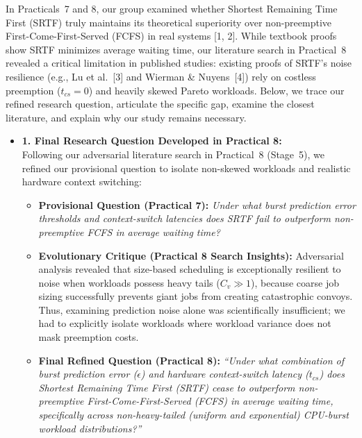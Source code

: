 \documentclass[11pt]{article}
\newcommand{\qLabel}[1]{
    {\fontsize{10.2}{12.2}\selectfont \textbf{#1}}
}
\begin{document}
In Practicals~7 and 8, our group examined whether Shortest Remaining Time First (SRTF) truly maintains its theoretical superiority over non-preemptive First-Come-First-Served (FCFS) in real systems [1, 2]. While textbook proofs show SRTF minimizes average waiting time, our literature search in Practical~8 revealed a critical limitation in published studies: existing proofs of SRTF's noise resilience (e.g., Lu et al.~[3] and Wierman \& Nuyens~[4]) rely on costless preemption ($t_{cs} = 0$) and heavily skewed Pareto workloads. Below, we trace our refined research question, articulate the specific gap, examine the closest literature, and explain why our study remains necessary.

\begin{itemize}[leftmargin=1.2em, itemsep=0.45em, parsep=0pt]

    \item \qLabel{1. Final Research Question Developed in Practical 8:} \\
    Following our adversarial literature search in Practical~8 (Stage~5), we refined our provisional question to isolate non-skewed workloads and realistic hardware context switching:
    \begin{itemize}[label=$\circ$, leftmargin=1.2em, itemsep=0.2em]
        \item \textbf{Provisional Question (Practical 7):} \textit{Under what burst prediction error thresholds and context-switch latencies does SRTF fail to outperform non-preemptive FCFS in average waiting time?}
        \item \textbf{Evolutionary Critique (Practical 8 Search Insights):} Adversarial analysis revealed that size-based scheduling is exceptionally resilient to noise when workloads possess heavy tails ($C_v \gg 1$), because coarse job sizing successfully prevents giant jobs from creating catastrophic convoys. Thus, examining prediction noise alone was scientifically insufficient; we had to explicitly isolate workloads where workload variance does not mask preemption costs.
        \item \textbf{Final Refined Question (Practical 8):} \textit{``Under what combination of burst prediction error ($\epsilon$) and hardware context-switch latency ($t_{cs}$) does Shortest Remaining Time First (SRTF) cease to outperform non-preemptive First-Come-First-Served (FCFS) in average waiting time, specifically across non-heavy-tailed (uniform and exponential) CPU-burst workload distributions?''}
    \end{itemize}


\end{itemize}
\end{document}
